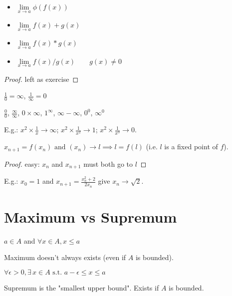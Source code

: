 \begin{question}
	\begin{itemize}
		\item $\lim\limits_{x \to a} \phi(f(x))$
		\item $\lim\limits_{x \to a} f(x)+g(x)$
		\item $\lim\limits_{x \to a} f(x)*g(x)$
		\item $\lim\limits_{x \to a} f(x)/g(x) \qquad g(x) \neq 0$
	\end{itemize}
\end{question}
\begin{proof}
	left as exercise
\end{proof}

\begin{property}
	$\frac{1}{0} = \infty$, $\frac{1}{\infty} = 0$
\end{property}
\begin{property}
	$\frac{0}{0}$, $\frac{\infty}{\infty}$, $0 \times \infty$, $1^\infty$, $\infty - \infty$, $0^0$, $\infty^0$
\end{property}
E.g.: $x^2 \times \frac{1}{x} \to \infty$; $x^2 \times \frac{1}{x^2} \to 1$; $x^2 \times \frac{1}{x^3} \to 0$.

\begin{theorem}
	$x_{n+1} = f(x_n) \text{ and } (x_n) \to l \implies l = f(l)$ (i.e. $l$ is a fixed point of $f$). 
\end{theorem}
\begin{proof}
	easy: $x_n$ and $x_{n+1}$ must both go to $l$
\end{proof}
E.g.: $x_0=1$ and $x_{n+1}=\frac{x_n^2+2}{2x_n}$ give $x_n \to \sqrt{2}$.


\section{Maximum vs Supremum}

\begin{definition}[$a$ maximum of $A$]
	$a \in A$ and $\forall x \in A, x \leq a$
\end{definition}
Maximum doesn't always exists (even if $A$ is bounded).
\begin{definition}[$a$ supremum of $A$]
	$\forall \epsilon>0, \exists \, x \in A \text{ s.t. } a-\epsilon \leq x \leq a$
\end{definition}
Supremum is the "smallest upper bound". Exists if $A$ is bounded.

